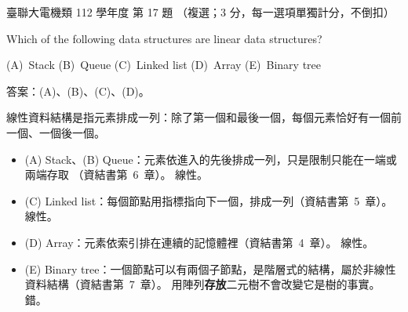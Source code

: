 \begin{pastexam}[label={px:ust-112-ee-ds-17}]{臺聯大電機類 112 學年度 第 17 題}
（複選；3 分，每一選項單獨計分，不倒扣）

Which of the following data structures are linear data structures?

(A)~Stack \qquad (B)~Queue \qquad (C)~Linked list \qquad (D)~Array \qquad (E)~Binary tree
\end{pastexam}

\begin{pastsoln}
答案：(A)、(B)、(C)、(D)。

線性資料結構是指元素排成一列：除了第一個和最後一個，每個元素恰好有一個前一個、一個後一個。

\begin{itemize}
\item (A) Stack、(B) Queue：元素依進入的先後排成一列，只是限制只能在一端或兩端存取
（資結書第~6~章）。 線性。
\item (C) Linked list：每個節點用指標指向下一個，排成一列（資結書第~5~章）。 線性。
\item (D) Array：元素依索引排在連續的記憶體裡（資結書第~4~章）。 線性。
\item (E) Binary tree：一個節點可以有兩個子節點，是階層式的結構，屬於非線性資料結構（資結書第~7~章）。
用陣列\textbf{存放}二元樹不會改變它是樹的事實。 錯。
\end{itemize}
\end{pastsoln}
